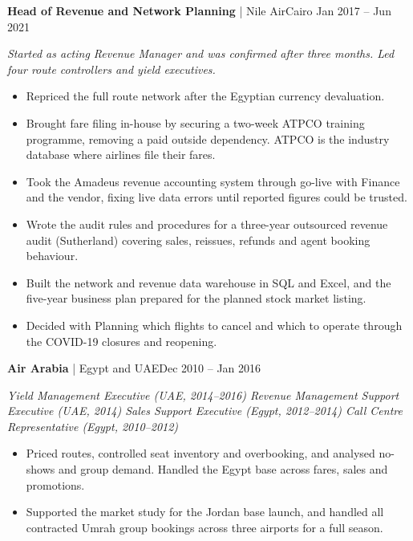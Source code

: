\documentclass[10pt,a4paper]{article}
\newcommand{\role}[3]{\vspace{5pt}\needspace{3\baselineskip}\textbf{#1}\,\,|\,\,#2\hfill{\small\color{muted}#3}\par}
\newcommand{\rolenote}[1]{{\small\itshape\color{muted}#1}\par}
\begin{document}
\role{Head of Revenue and Network Planning}{Nile Air}{Cairo \textperiodcentered{} Jan 2017 -- Jun 2021}
\rolenote{Started as acting Revenue Manager and was confirmed after three months. Led four route controllers and yield executives.}
\begin{itemize}
  \item Repriced the full route network after the Egyptian currency devaluation.
  \item Brought fare filing in-house by securing a two-week ATPCO training programme, removing a paid outside dependency. ATPCO is the industry database where airlines file their fares.
  \item Took the Amadeus revenue accounting system through go-live with Finance and the vendor, fixing live data errors until reported figures could be trusted.
  \item Wrote the audit rules and procedures for a three-year outsourced revenue audit (Sutherland) covering sales, reissues, refunds and agent booking behaviour.
  \item Built the network and revenue data warehouse in SQL and Excel, and the five-year business plan prepared for the planned stock market listing.
  \item Decided with Planning which flights to cancel and which to operate through the COVID-19 closures and reopening.
\end{itemize}

\role{Air Arabia}{Egypt and UAE}{Dec 2010 -- Jan 2016}
\rolenote{Yield Management Executive (UAE, 2014--2016)  \textperiodcentered{}  Revenue Management Support Executive (UAE, 2014)  \textperiodcentered{}  Sales Support Executive (Egypt, 2012--2014)  \textperiodcentered{}  Call Centre Representative (Egypt, 2010--2012)}
\begin{itemize}
  \item Priced routes, controlled seat inventory and overbooking, and analysed no-shows and group demand. Handled the Egypt base across fares, sales and promotions.
  \item Supported the market study for the Jordan base launch, and handled all contracted Umrah group bookings across three airports for a full season.
\end{itemize}
\end{document}
